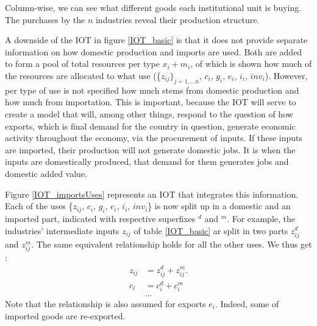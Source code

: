 \documentclass[12pt,english]{article}
\begin{document}
Column-wise, we can see what different goods each institutional unit is buying. The purchases by the $n$ industries reveal their production structure. %

A downside of the IOT in figure \ref{IOT_basic} is that it does not provide separate information on how domestic production and imports are used. Both are added to form a pool of total resources per type $x_i + m_i$, of which is shown how much of the resources are allocated to what use (\{$z_{ij}\}_{j=1,\ldots n}$, $c_i$, $g_i$, $e_i$, $i_i$, $inv_i$). However, per type of use is not specified how much stems from domestic production and how much from importation. This is important, because the IOT will serve to create a model that will, among other things, respond to the question of how exports, which is final demand for the country in question, generate economic activity throughout the economy, via the procurement of inputs. If these inputs are imported, their production will not generate domestic jobs. It is when the inputs are domestically produced, that demand for them generates jobs and domestic added value. 


Figure \ref{IOT_importsUses} represents an IOT that integrates this information. Each of the uses \{$z_{ij}$, $c_i$, $g_i$, $e_i$, $i_i$,  $inv_i$\} is now split up in a domestic and an imported part, indicated with respective superfixes $^d$ and $^m$. For example, the industries' intermediate inputs $z_{ij}$ of table \ref{IOT_basic} ar split in two parts $z_{ij}^d$ and $z_{ij}^m$. The same equivalent relationship holds for all the other uses. We thus get : 
\begin{align}
z_{ij} &= z_{ij}^d + z_{ij}^m. \label{usesDecompMX} \\
c_i &= c_i^d + c_i^m \nonumber \\
&\ldots \nonumber
\end{align}  Note that the relationship is also assumed for exports $e_i$. Indeed, some of imported goods are re-exported. 	
\end{document}
